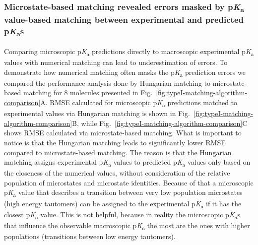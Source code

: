 \documentclass[9pt,lineno,final]{elife}
\newcommand{\pKa}{p\textit{K}\textsubscript{a}}
\begin{document}
\subsubsection{Microstate-based matching revealed errors masked by \pKa{} value-based matching between experimental and predicted \pKa{}s}


Comparing microscopic \pKa{} predictions directly to macroscopic experimental \pKa{} values with numerical matching can lead to underestimation of errors. 
To demonstrate how numerical matching often masks the \pKa{} prediction errors we compared the performance analysis done by Hungarian matching to microstate-based matching for 8 molecules presented in Fig.~\ref{fig:typeI-matching-algorithm-comparison}A. RMSE calculated for microscopic \pKa{} predictions matched to experimental values via Hungarian matching is shown in Fig.~\ref{fig:typeI-matching-algorithm-comparison}B, while Fig.~\ref{fig:typeI-matching-algorithm-comparison}C shows RMSE calculated via microstate-based matching. 
What is important to notice is that the Hungarian matching leads to significantly lower RMSE compared to microstate-based matching. The reason is that the Hungarian matching assigns experimental \pKa{} values to predicted \pKa{} values only based on the closeness of the numerical values, without consideration of the relative population of microstates and microstate identities. 
Because of that a microscopic \pKa{} value that describes a transition between very low population microstates (high energy tautomers) can be assigned to the experimental \pKa{} if it has the closest \pKa{} value. 
This is not helpful, because in reality the microscopic \pKa{}s that influence the observable macroscopic \pKa{} the most are the ones with higher populations (transitions between low energy tautomers).
\end{document}
